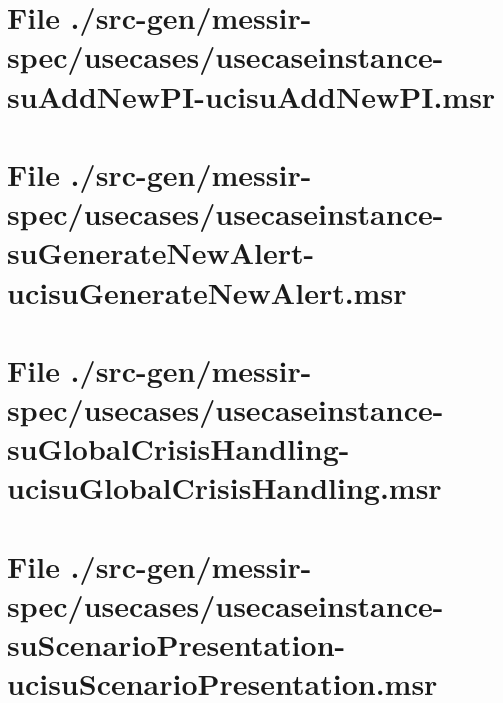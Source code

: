 \section[File /src-gen/messir-spec/usecases/usecaseinstance-suAddNewPI-ucisuAddNewPI.msr]{File ./src-gen/messir-spec/usecases/usecaseinstance-suAddNewPI-ucisuAddNewPI.msr}
\scriptsize

\normalsize
	
\section[File /src-gen.../usecaseinstance-suGenerateNewAlert-ucisuGenerateNewAlert.msr]{File ./src-gen/messir-spec/usecases/usecaseinstance-suGenerateNewAlert-ucisuGenerateNewAlert.msr}
\scriptsize

\normalsize
	
\section[File /.../usecaseinstance-suGlobalCrisisHandling-ucisuGlobalCrisisHandling.msr]{File ./src-gen/messir-spec/usecases/usecaseinstance-suGlobalCrisisHandling-ucisuGlobalCrisisHandling.msr}
\scriptsize

\normalsize
	
\section[File /.../usecaseinstance-suScenarioPresentation-ucisuScenarioPresentation.msr]{File ./src-gen/messir-spec/usecases/usecaseinstance-suScenarioPresentation-ucisuScenarioPresentation.msr}
\scriptsize

\normalsize
	
